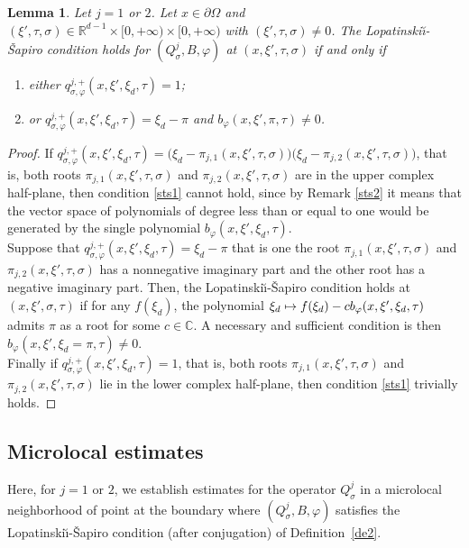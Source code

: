 \documentclass[JEP,XML,SOM,Unicode,published]{cedram}
\newcommand\mto{\mathchoice{\longmapsto}{\mapsto}{\mapsto}{\mapsto}}
\theoremstyle{plain}
\newtheorem{lemma}[theorem]{Lemma}
\theoremstyle{definition}
\def\R{\mathbb{R}}
\def\C{\mathbb{C}}
\newcommand{\LS}{Lopatinski\u{\i}-\v{S}apiro\xspace}
\newcommand{\nhd}{neighborhood\xspace}
\newcommand{\Qsig}{Q_{\sigma}}
\newcommand{\qconj}{q_{\sigma,\varphi}}
\begin{document}
\begin{lemma}
\label{sl1}
Let $j=1$ or $2$. Let $x \in \partial\Omega$ and $(\xi',\tau, \sigma)\in
\R^{d-1}\times [0,+\infty) \times
[0,+\infty)$ with $(\xi',\tau,\sigma)\neq 0$. The \LS condition
holds for $(\Qsig^j,B,\varphi)$ at $(x,\xi',\tau,\sigma)$
if and only if
\begin{enumerate}
\item either $\qconj^{j,+} (x,\xi',\xi_d,\tau)=1$;
\item or
$\qconj^{j,+} (x,\xi',\xi_d,\tau)=\xi_d-\pi$
and $b_{\varphi}(x,\xi',\pi,\tau)\neq 0$.
\end{enumerate}
\end{lemma}
\begin{proof}
If
$\qconj^{j,+} (x,\xi',\xi_d,\tau)=\big(\xi_d-\pi_{j,1}
(x,\xi',\tau,\sigma)\big)
\big(\xi_d-\pi_{j,2} (x,\xi',\tau,\sigma)\big)$,
that is, both roots $\pi_{j,1} (x,\xi',\tau,\sigma)$ and $\pi_{j,2} (x,\xi',\tau,\sigma)$ are in the upper
complex half-plane, then condition \eqref{sts1} cannot hold, since
by Remark \ref{sts2} it means that the vector space of polynomials
of degree less than or equal to one would be generated by the single polynomial $b_{\varphi}(x,\xi',\xi_d,\tau)$.\\
Suppose that $\qconj^{j,+} (x,\xi',\xi_d,\tau)=\xi_d-\pi$ that is
one the root $\pi_{j,1} (x,\xi',\tau,\sigma)$ and $\pi_{j,2} (x,\xi',\tau,\sigma)$ has a nonnegative imaginary
part and the other root has a negative imaginary part. Then, the \LS condition holds at $(x,\xi',\sigma,\tau)$ if for any $f(\xi_d)$, the polynomial $\xi_d\mto f(\xi_d)-c b_{\varphi}(x,\xi',\xi_d,\tau)$ admits $\pi$ as a root for some $c\in\C$. A necessary and sufficient condition is then $b_{\varphi}(x,\xi',\xi_d=\pi,\tau)\neq 0$.\\
Finally if $\qconj^{j,+} (x,\xi',\xi_d,\tau)=1$, that
is, both roots $\pi_{j,1} (x,\xi',\tau,\sigma)$ and $\pi_{j,2} (x,\xi',\tau,\sigma)$ lie in the lower complex
half-plane, then condition \eqref{sts1} trivially holds.
\end{proof}

\subsection{Microlocal estimates}

Here, for $j=1$ or $2$, we establish estimates for the operator
$\Qsig^j$ in a microlocal \nhd of point at the boundary where
$(\Qsig^j,B,\varphi)$ satisfies the \LS condition (after conjugation)
of Definition~\ref{de2}.
\end{document}
